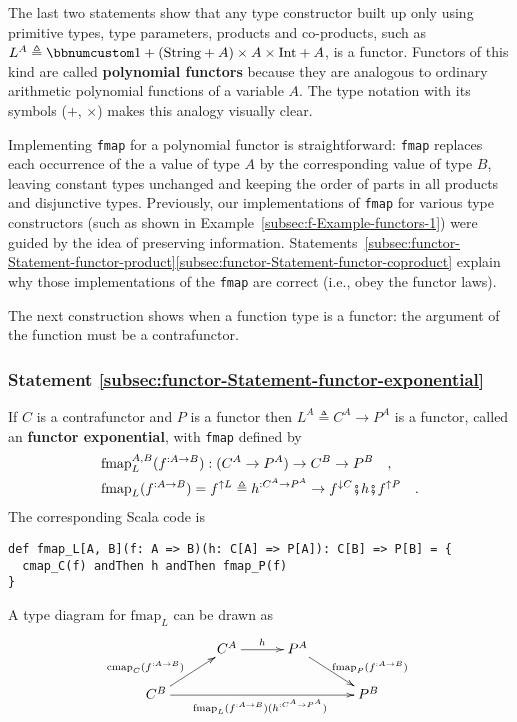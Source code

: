 The last two statements show that any type constructor built up only
using primitive types, type parameters, products and co-products,
such as $L^{A}\triangleq\bbnum 1+(\text{String}+A)\times A\times\text{Int}+A$,
is a functor. Functors of this kind are called \textbf{polynomial
functors} because they are analogous to ordinary arithmetic polynomial
functions of a variable $A$. The type notation with its symbols ($+$,
$\times$) makes this analogy visually clear. 

Implementing \lstinline!fmap! for a polynomial functor is straightforward:
\lstinline!fmap! replaces each occurrence of the a value of type
$A$ by the corresponding value of type $B$, leaving constant types
unchanged and keeping the order of parts in all products and disjunctive
types. Previously, our implementations of \lstinline!fmap! for various
type constructors (such as shown in Example~\ref{subsec:f-Example-functors-1})
were guided by the idea of preserving information. Statements~\ref{subsec:functor-Statement-functor-product}\textendash \ref{subsec:functor-Statement-functor-coproduct}
explain why those implementations of the \lstinline!fmap! are correct
(i.e., obey the functor laws).

The next construction shows when a function type is a functor: the
argument of the function must be a contrafunctor.

\subsubsection{Statement \label{subsec:functor-Statement-functor-exponential}\ref{subsec:functor-Statement-functor-exponential}}

If $C$ is a contrafunctor and $P$ is a functor then $L^{A}\triangleq C^{A}\rightarrow P^{A}$
is a functor, called an \textbf{functor
exponential}, with \lstinline!fmap! defined by
\begin{align}
 & \text{fmap}_{L}^{A,B}(f^{:A\rightarrow B}):(C^{A}\rightarrow P^{A})\rightarrow C^{B}\rightarrow P^{B}\quad,\nonumber \\
 & \text{fmap}_{L}(f^{:A\rightarrow B})=f^{\uparrow L}\triangleq h^{:C^{A}\rightarrow P^{A}}\rightarrow f^{\downarrow C}\bef h\bef f^{\uparrow P}\quad.\label{eq:f-functor-exponential-def-of-fmap}
\end{align}
The corresponding Scala code is
\begin{lstlisting}
def fmap_L[A, B](f: A => B)(h: C[A] => P[A]): C[B] => P[B] = {
  cmap_C(f) andThen h andThen fmap_P(f)
}
\end{lstlisting}
A type diagram for $\text{fmap}_{L}$ can be drawn as
\[
\xymatrix{\xyScaleY{1.5pc}\xyScaleX{2.5pc} & C^{A}\ar[r]\sp(0.5){h} & P^{A}\ar[rd]\sp(0.6){\ \text{fmap}_{P}(f^{:A\rightarrow B})\ }\\
C^{B}\ar[ru]\sp(0.4){\text{cmap}_{C}(f^{:A\rightarrow B})\ ~~}\ar[rrr]\sb(0.5){\text{fmap}_{L}(f^{:A\rightarrow B})(h^{:C^{A}\rightarrow P^{A}})\ } &  &  & P^{B}
}
\]



